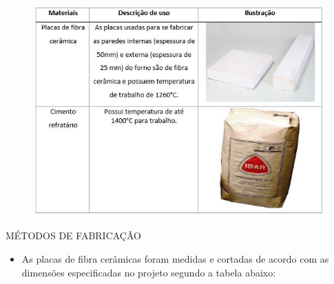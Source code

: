 \begin{figure}[!ht]
	\centering
	\label{res1}
	\includegraphics[keepaspectratio=true,scale=0.8]{figuras/res1.JPG}
\end{figure}

MÉTODOS DE FABRICAÇÃO
\begin{itemize}
	\item As placas de fibra cerâmicas foram medidas e cortadas de acordo com as dimensões especificadas no projeto segundo a tabela abaixo:
\end{itemize}

